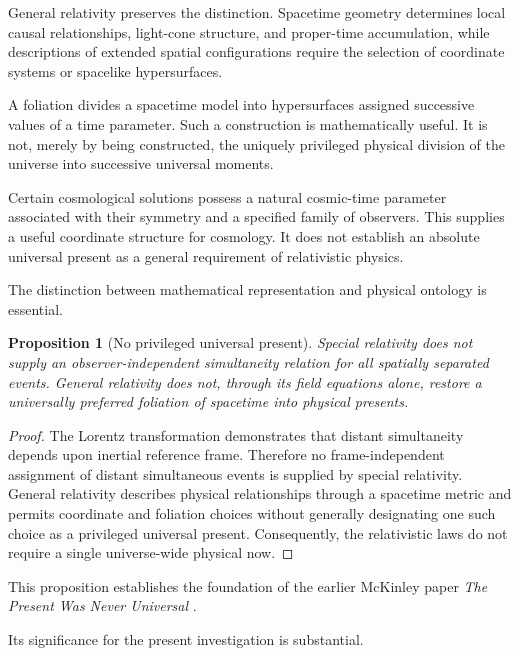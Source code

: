 \documentclass[12pt,onecolumn]{article}
\newtheorem{proposition}{Proposition}[section]
\begin{document}
General relativity preserves the distinction. Spacetime geometry determines local causal relationships, light-cone structure, and proper-time accumulation, while descriptions of extended spatial configurations require the selection of coordinate systems or spacelike hypersurfaces.

A foliation divides a spacetime model into hypersurfaces assigned successive values of a time parameter. Such a construction is mathematically useful. It is not, merely by being constructed, the uniquely privileged physical division of the universe into successive universal moments.

Certain cosmological solutions possess a natural cosmic-time parameter associated with their symmetry and a specified family of observers. This supplies a useful coordinate structure for cosmology. It does not establish an absolute universal present as a general requirement of relativistic physics.

The distinction between mathematical representation and physical ontology is essential.

\begin{proposition}[No privileged universal present]

Special relativity does not supply an observer-independent simultaneity relation for all spatially separated events. General relativity does not, through its field equations alone, restore a universally preferred foliation of spacetime into physical presents.

\end{proposition}

\begin{proof}

The Lorentz transformation demonstrates that distant simultaneity depends upon inertial reference frame. Therefore no frame-independent assignment of distant simultaneous events is supplied by special relativity. General relativity describes physical relationships through a spacetime metric and permits coordinate and foliation choices without generally designating one such choice as a privileged universal present. Consequently, the relativistic laws do not require a single universe-wide physical now.

\end{proof}

This proposition establishes the foundation of the earlier McKinley paper \emph{The Present Was Never Universal} \cite{PresentNeverUniversal}.

Its significance for the present investigation is substantial.
\end{document}
